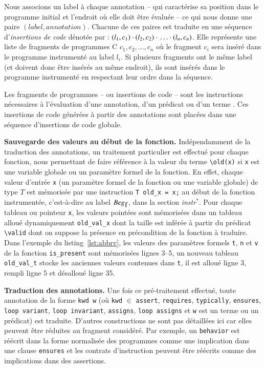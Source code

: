 Nous associons un label à chaque annotation -- qui caractérise sa position dans
le programme initial et l'endroit où elle doit être évaluée -- ce qui nous
donne une paire $(label, annotation)$.
Chacune de ces paires est traduite en une séquence
d'\emph{insertions de code} dénotée par :
$(l_1, c_1) \cdot{} (l_2, c_2) \cdot{} \ldots \cdot{} (l_n, c_n)$.
Elle représente une liste de fragments de programmes C $c_1, c_2, \ldots, c_n$
où le fragment $c_i$ sera inséré dans le programme instrumenté au label $l_i$.
Si plusieurs fragments ont le même label (et doivent donc être insérés au
même endroit), ils sont insérés dans le programme instrumenté en respectant leur
ordre dans la séquence.

Les fragments de programmes -- ou insertions de code -- sont les instructions
nécessaires à l'évaluation d'une annotation, d'un prédicat ou d'un terme
\eacsl.
Ces insertions de code générées à partir des annotations sont placées
dans une séquence d'insertions de code globale.

\textbf{Sauvegarde des valeurs  au début de la fonction.}
Indépendamment de la traduction des annotations, un traitement particulier est
effectué pour chaque fonction, nous permettant de faire référence à la valeur
du terme \lstinline'\old(x)' si \lstinline'x' est une variable globale ou un
paramètre formel de la fonction.
En effet, chaque valeur d'entrée \lstinline'x' (un paramètre formel de la
fonction ou une variable globale) de type $T$ est mémorisée par
une instruction \lstinline'T old_x = x;' au début de la fonction
instrumentée, c'est-à-dire au label $Beg_{\mbox{\lstinline'f'}}$, dans la section
\textit{instr}$^{*}$.
Pour chaque tableau ou pointeur \lstinline'x', les valeurs pointées sont
mémorisées dans un tableau alloué dynamiquement \lstinline'old_val_x' dont la
taille est inférée à partir du prédicat \lstinline'\valid' dont on suppose la
présence en précondition de la fonction à traduire.
Dans l'exemple du listing~\ref{lst:abbrv}, les valeurs des paramètres formels
\lstinline't', \lstinline'n' et \lstinline'v' de la fonction
\lstinline'is_present' sont mémorisées lignes 3--5, un
nouveau tableau \lstinline'old_val_t' stocke les anciennes valeurs contenues
dans \lstinline't', il est alloué ligne 3, rempli ligne 5 et désalloué ligne 35.

\textbf{Traduction des annotations.}
Une fois ce pré-traitement effectué, toute annotation \eacsl de la forme
\lstinline'kwd w' (où \lstinline'kwd' $\in$ \bopen \lstinline'assert',
\lstinline'requires', \lstinline'typically', \lstinline'ensures',
\lstinline'loop variant', \lstinline'loop invariant', \lstinline'assigns',
\lstinline'loop assigns' \bclose et \lstinline'w' est un terme ou un prédicat)
est traduite.
D'autres constructions \eacsl ne sont pas détaillées ici car elles peuvent être
réduites au fragment \eacsl considéré.
Par exemple, un \lstinline'behavior' est réécrit dans la forme normalisée des
programmes comme une implication dans une clause \lstinline'ensures' et les
contrats d'instruction peuvent être réécrits comme des implications dans des
assertions.

